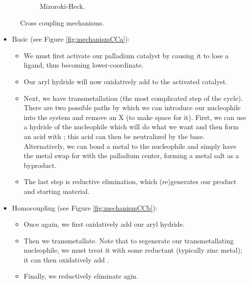 \documentclass[../notes.tex]{subfiles}
\begin{document}
\begin{itemize}
\begin{figure}[h!]
\begin{subfigure}[b]{0.8\linewidth}
            \caption{Mizoroki-Heck.}
            \label{fig:mechanismCCc}
        \end{subfigure}
        \caption{Cross coupling mechanisms.}
        \label{fig:mechanismCC}
    \end{figure}
    \begin{itemize}
        \item Basic (see Figure \ref{fig:mechanismCCa}):
        \begin{itemize}
            \item We must first activate our palladium catalyst by causing it to lose a ligand, thus becoming lower-coordinate.
            \item Our aryl hydride will now oxidatively add to the activated catalyst.
            \item Next, we have transmetallation (the most complicated step of the cycle). There are two possible paths by which we can introduce our nucleophile into the system and remove an X (to make space for it). First, we can use a hydride of the nucleophile which will do what we want and then form an acid with ; this acid can then be neutralized by the base. Alternatively, we can bond a metal to the nucleophile and simply have the metal swap  for  with the palladium center, forming a metal salt as a byproduct.
            \item The last step is reductive elimination, which (re)generates our product and starting material.
        \end{itemize}
        \item Homocoupling (see Figure \ref{fig:mechanismCCb}):
        \begin{itemize}
            \item Once again, we first oxidatively add our aryl hydride.
            \item Then we transmetallate. Note that to regenerate our transmetallating nucleophile, we must treat it with some reductant (typically zinc metal); it can then oxidatively add .
            \item Finally, we reductively eliminate agin.
        \end{itemize}

\end{itemize}
\end{itemize}
\end{document}
